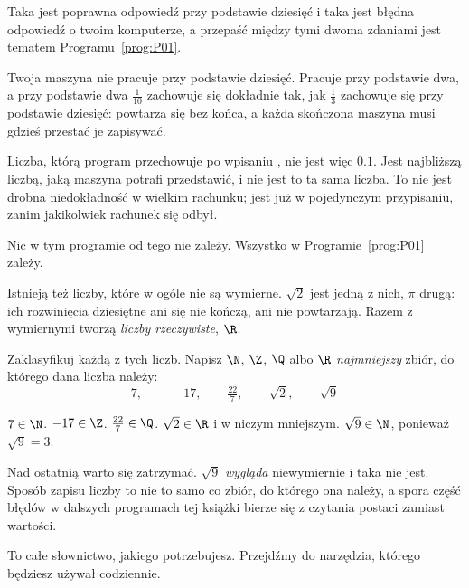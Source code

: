 \begin{fr}
Taka jest poprawna odpowiedź przy podstawie dziesięć i taka jest błędna
odpowiedź o twoim komputerze, a przepaść między tymi dwoma zdaniami jest
tematem Programu~\ref{prog:P01}.

\begin{trapbox}
Twoja maszyna nie pracuje przy podstawie dziesięć. Pracuje przy podstawie dwa,
a przy podstawie dwa $\tfrac{1}{10}$ zachowuje się dokładnie tak, jak
$\tfrac{1}{3}$ zachowuje się przy podstawie dziesięć: powtarza się bez końca,
a każda skończona maszyna musi gdzieś przestać je zapisywać.

Liczba, którą program przechowuje po wpisaniu , nie jest więc
$\num{0.1}$. Jest najbliższą liczbą, jaką maszyna potrafi przedstawić, i nie
jest to ta sama liczba. To nie jest drobna niedokładność w wielkim rachunku;
jest już w pojedynczym przypisaniu, zanim jakikolwiek rachunek się odbył.

Nic w tym programie od tego nie zależy. Wszystko w
Programie~\ref{prog:P01} zależy.
\end{trapbox}

Istnieją też liczby, które w ogóle nie są wymierne. $\sqrt{2}$ jest jedną z
nich, $\pi$ drugą: ich rozwinięcia dziesiętne ani się nie kończą, ani nie
powtarzają. Razem z wymiernymi tworzą \emph{liczby rzeczywiste}, $\R$.
\end{fr}


\begin{fr}
Zaklasyfikuj każdą z tych liczb. Napisz $\N$, $\Z$, $\Q$ albo $\R$ \dash{}
\emph{najmniejszy} zbiór, do którego dana liczba należy:
\[ 7, \qquad -17, \qquad \tfrac{22}{7}, \qquad \sqrt{2}, \qquad \sqrt{9} \]
\dotline
\nextframe
\end{fr}

\begin{fr}
\begin{ansblock}
$7 \in \N$. \quad $-17 \in \Z$. \quad $\tfrac{22}{7} \in \Q$. \quad
$\sqrt{2} \in \R$ i w niczym mniejszym. \quad $\sqrt{9} \in \N$, ponieważ
$\sqrt{9} = 3$.

Nad ostatnią warto się zatrzymać. $\sqrt{9}$ \emph{wygląda} niewymiernie i taka
nie jest. Sposób zapisu liczby to nie to samo co zbiór, do którego ona należy,
a spora część błędów w dalszych programach tej książki bierze się z czytania
postaci zamiast wartości.
\end{ansblock}

To całe słownictwo, jakiego potrzebujesz. Przejdźmy do narzędzia, którego
będziesz używał codziennie.
\end{fr}

